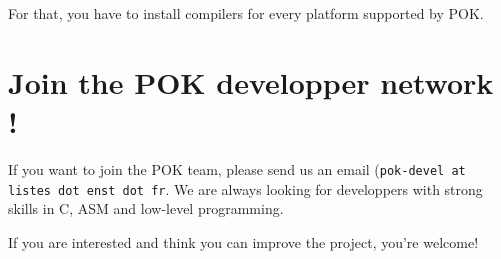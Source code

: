 \documentclass[oneside]{article}
\begin{document}
For that, you have to install compilers for every platform supported by POK.

\section{Join the POK developper network !}
If you want to join the POK team, please send us an email (\texttt{pok-devel at
listes dot enst dot fr}. We are always looking for developpers with strong
skills in C, ASM and low-level programming.

If you are interested and think you can improve the project, you're welcome!
\end{document}
